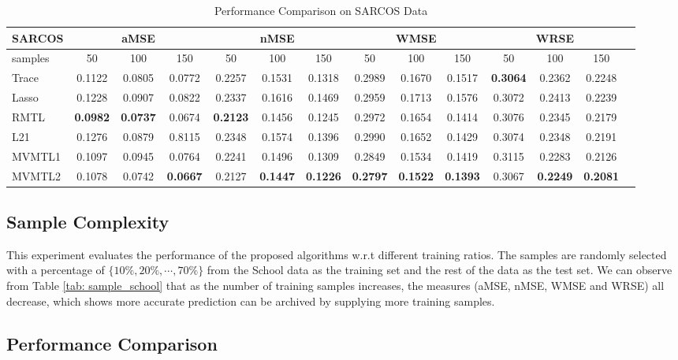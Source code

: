 \documentclass[twoside,leqno,twocolumn]{article}
\begin{document}
%
%
\begin{table}[h]
\begin{tabular}{|p{1cm}|c|c|c|c|c|c|c|c|c|c|c|c|c|}
\hline 
\tiny SARCOS & \multicolumn{3}{c|}{aMSE} & \multicolumn{3}{c|}{nMSE} & \multicolumn{3}{c|}{WMSE} & \multicolumn{3}{c|}{WRSE}\tabularnewline
\hline 
\tiny samples & 50 & 100 & 150 & 50 & 100 & 150 & 50 & 100 & 150 & 50 & 100 & 150\tabularnewline
\hline 
\tiny Trace & 0.1122 & 0.0805 & 0.0772 & 0.2257 & 0.1531 & 0.1318 & 0.2989 & 0.1670 & 0.1517 & \textbf{0.3064} & 0.2362 & 0.2248\tabularnewline
\hline 
\tiny Lasso & 0.1228 & 0.0907 & 0.0822 & 0.2337 & 0.1616 & 0.1469 & 0.2959 & 0.1713 & 0.1576 & 0.3072 & 0.2413 & 0.2239\tabularnewline
\hline 
\tiny RMTL & \small\textbf{0.0982} & \small\textbf{0.0737} & 0.0674 & \small\textbf{0.2123} & 0.1456 & 0.1245 & 0.2972 & 0.1654 & 0.1414 & 0.3076 & 0.2345 & 0.2179\tabularnewline
\hline 
\tiny L21  & 0.1276 & 0.0879 & 0.8115 & 0.2348 & 0.1574 & 0.1396 & 0.2990 & 0.1652 & 0.1429 & 0.3074 & 0.2348 & 0.2191\tabularnewline
\hline 
\tiny MVMTL1 & 0.1097 & 0.0945 & 0.0764 & 0.2241 & 0.1496 & 0.1309 & 0.2849 & 0.1534 & 0.1419 & 0.3115 & 0.2283 & 0.2126\tabularnewline
\hline 
\tiny MVMTL2 & 0.1078 & 0.0742 & \small\textbf{0.0667} & 0.2127 & \small\textbf{0.1447} & \textbf{0.1226} & \textbf{0.2797} & \small\textbf{0.1522} & \small\textbf{0.1393} & 0.3067 & \small\textbf{0.2249} & \small\textbf{0.2081}\tabularnewline
\hline 
\end{tabular}
\caption{Performance Comparison on SARCOS Data}
\label{tab:per_sarcos}
\end{table}


\subsection{Sample Complexity}

This experiment evaluates the performance of the proposed algorithms w.r.t different training ratios. The samples are randomly selected with a percentage of
$\{10\%,20\%,\cdots,70\%\}$ from the School data as the training
set and the rest of the data as the test set. We can observe from Table \ref{tab: sample_school} that as the number of training samples increases, the measures (aMSE, nMSE, WMSE and WRSE) all decrease, which
shows more accurate prediction can be archived by supplying more training samples. 

\subsection{Performance Comparison}
\end{document}
